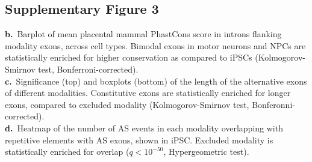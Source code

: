 \pagebreak
\subsection{Supplementary Figure 3}


\captionsetup{justification=raggedright
}
\textbf{b.}~Barplot of mean placental mammal PhastCons score in introns flanking modality exons, across cell types. Bimodal exons in motor neurons  and NPCs are statistically enriched for higher conservation as compared to iPSCs (Kolmogorov-Smirnov test, Bonferroni-corrected).\\
\textbf{c.}~Significance (top) and boxplots (bottom) of the length of the alternative exons of different modalities. Constitutive exons are statistically enriched for longer exons, compared to excluded modality (Kolmogorov-Smirnov test, Bonferonni-corrected).\\
\textbf{d.}~Heatmap of the number of AS events in each modality overlapping with repetitive elements with AS exons, shown in iPSC. Excluded modality is statistically enriched for overlap ($q < 10^{-50}$, Hypergeometric test).\\
